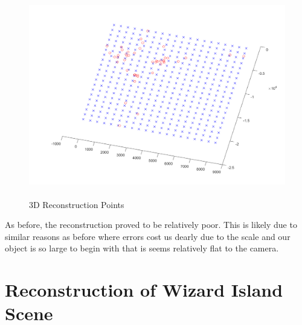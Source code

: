 \documentclass[11pt,psfig]{article}
\begin{document}
\begin{figure}[H]
\centering
\includegraphics[height=3.5in]{sfmResults1/triangulationAttemptSIFT4.png}
\caption{3D Reconstruction Points}
\end{figure}

As before, the reconstruction proved to be relatively poor. This is likely due to similar reasons as before where errors cost us dearly due to the scale and our object is so large to begin with that is seems relatively flat to the camera. 

\section{Reconstruction of Wizard Island Scene}


\end{document}
